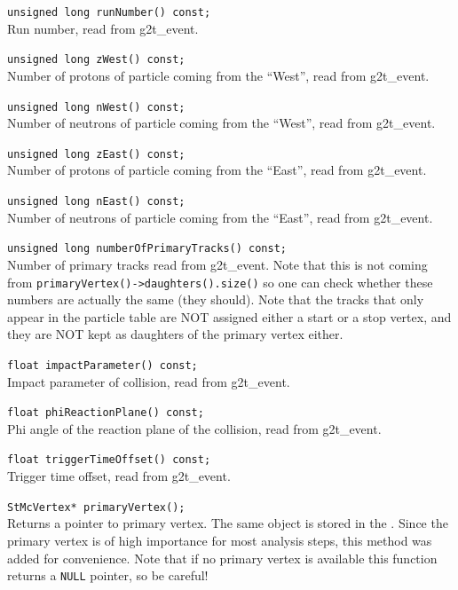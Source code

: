 \begin{Entry}
    \verb+unsigned long runNumber() const;+\\
    Run number, read from g2t\_event.

    \verb+unsigned long zWest() const;+\\
    Number of protons of particle coming from the ``West'', read from g2t\_event.

    \verb+unsigned long nWest() const;+\\
    Number of neutrons of particle coming from the ``West'', read from g2t\_event.

    \verb+unsigned long zEast() const;+\\
    Number of protons of particle coming from the ``East'', read from g2t\_event.

    \verb+unsigned long nEast() const;+\\
    Number of neutrons of particle coming from the ``East'', read from g2t\_event.

    \verb+unsigned long numberOfPrimaryTracks() const;+\\
    Number of primary tracks read from g2t\_event.  Note that this is
    not coming from {\tt primaryVertex()->daughters().size()} so one
    can check whether these numbers are actually the same (they should).  Note
    that the tracks that only appear in the particle table are NOT assigned
    either a start or a stop vertex, and they are NOT kept as daughters
    of the primary vertex either.

    \verb+float impactParameter() const;+\\
    Impact parameter of collision, read from g2t\_event.

    \verb+float phiReactionPlane() const;+\\
    Phi angle of the reaction plane of the collision, read from g2t\_event.

    \verb+float triggerTimeOffset() const;+\\
    Trigger time offset, read from g2t\_event.

    \verb+StMcVertex* primaryVertex();+\\
    Returns a pointer to primary vertex. The same object is stored
    in the . Since the primary vertex is of
    high importance for most analysis steps, this method was added
    for convenience. Note that if no primary vertex is available
    this function returns a {\tt NULL} pointer, so be careful!


\end{Entry}
